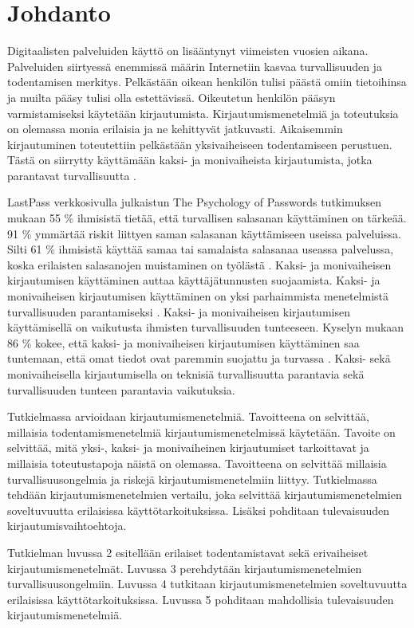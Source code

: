 \chapter{Johdanto\label{johdanto}}

Digitaalisten palveluiden käyttö on lisääntynyt viimeisten vuosien aikana. Palveluiden siirtyessä enemmissä määrin Internetiin kasvaa turvallisuuden ja todentamisen merkitys. Pelkästään oikean henkilön tulisi päästä omiin tietoihinsa ja muilta pääsy tulisi olla estettävissä. Oikeutetun henkilön pääsyn varmistamiseksi käytetään kirjautumista. Kirjautumismenetelmiä ja toteutuksia on olemassa monia erilaisia ja ne kehittyvät jatkuvasti. Aikaisemmin kirjautuminen toteutettiin pelkästään yksivaiheiseen todentamiseen perustuen. Tästä on siirrytty käyttämään kaksi- ja monivaiheista kirjautumista, jotka parantavat turvallisuutta \citep{cryptography2010001}.

LastPass verkkosivulla julkaistun The Psychology of Passwords tutkimuksen mukaan 55 \% ihmisistä tietää, että turvallisen salasanan käyttäminen on tärkeää. 91 \% ymmärtää riskit liittyen saman salasanan käyttämiseen useissa palveluissa. Silti 61 \% ihmisistä käyttää samaa tai samalaista salasanaa useassa palvelussa, koska erilaisten salasanojen muistaminen on työlästä \cite{lastpass}. Kaksi- ja monivaiheisen kirjautumisen käyttäminen auttaa käyttäjätunnusten suojaamista. Kaksi- ja monivaiheisen kirjautumisen käyttäminen on yksi parhaimmista menetelmistä turvallisuuden parantamiseksi \citep{top_security_practices}. Kaksi- ja monivaiheisen kirjautumisen käyttämisellä on vaikutusta ihmisten turvallisuuden tunteeseen. Kyselyn mukaan 86 \% kokee, että kaksi- ja monivaiheisen kirjautumisen käyttäminen saa tuntemaan, että omat tiedot ovat paremmin suojattu ja turvassa \citep{nist_2fa}. Kaksi- sekä monivaiheisella kirjautumisella on teknisiä turvallisuutta parantavia sekä turvallisuuden tunteen parantavia vaikutuksia.

Tutkielmassa arvioidaan kirjautumismenetelmiä. Tavoitteena on selvittää, millaisia todentamismenetelmiä kirjautumismenetelmissä käytetään. Tavoite on selvittää, mitä yksi-, kaksi- ja monivaiheinen kirjautumiset tarkoittavat ja millaisia toteutustapoja näistä on olemassa. Tavoitteena on selvittää millaisia turvallisuusongelmia ja riskejä kirjautumismenetelmiin liittyy. Tutkielmassa tehdään kirjautumismenetelmien vertailu, joka selvittää kirjautumismenetelmien soveltuvuutta erilaisissa käyttötarkoituksissa. Lisäksi pohditaan tulevaisuuden kirjautumisvaihtoehtoja.

Tutkielman luvussa 2 esitellään erilaiset todentamistavat sekä erivaiheiset kirjautumismenetelmät. Luvussa 3 perehdytään kirjautumismenetelmien turvallisuusongelmiin. Luvussa 4 tutkitaan kirjautumismenetelmien soveltuvuutta erilaisissa käyttötarkoituksissa. Luvussa 5 pohditaan mahdollisia tulevaisuuden kirjautumismenetelmiä.



